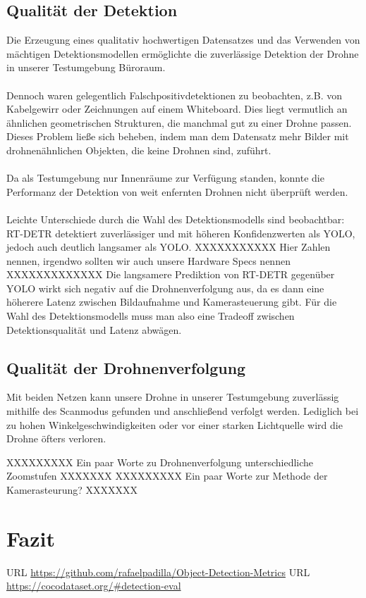 \documentclass[runningheads]{llncs}
\begin{document}
\subsection{Qualität der Detektion}
Die Erzeugung eines qualitativ hochwertigen Datensatzes und das Verwenden von mächtigen Detektionsmodellen ermöglichte die zuverlässige Detektion der Drohne in unserer Testumgebung Büroraum.\\\\
Dennoch waren gelegentlich Falschpositivdetektionen zu beobachten, z.B. von Kabelgewirr oder Zeichnungen auf einem Whiteboard. Dies liegt vermutlich an ähnlichen geometrischen Strukturen, die manchmal gut zu einer Drohne passen. Dieses Problem ließe sich beheben, indem man dem Datensatz mehr Bilder mit drohnenähnlichen Objekten, die keine Drohnen sind, zuführt.\\\\
Da als Testumgebung nur Innenräume zur Verfügung standen, konnte die Performanz der Detektion von weit enfernten Drohnen nicht überprüft werden.\\\\
Leichte Unterschiede durch die Wahl des Detektionsmodells sind beobachtbar: RT-DETR detektiert zuverlässiger und mit höheren Konfidenzwerten als YOLO, jedoch auch deutlich langsamer als YOLO. XXXXXXXXXXX Hier Zahlen nennen, irgendwo sollten wir auch unsere Hardware Specs nennen XXXXXXXXXXXXX
Die langsamere Prediktion von RT-DETR gegenüber YOLO wirkt sich negativ auf die Drohnenverfolgung aus, da es dann eine höherere Latenz zwischen Bildaufnahme und Kamerasteuerung gibt.
Für die Wahl des Detektionsmodells muss man also eine Tradeoff zwischen Detektionsqualität und Latenz abwägen.
\subsection{Qualität der Drohnenverfolgung}
Mit beiden Netzen kann unsere Drohne in unserer Testumgebung zuverlässig mithilfe des Scanmodus gefunden und anschließend verfolgt werden.
Lediglich bei zu hohen Winkelgeschwindigkeiten oder vor einer starken Lichtquelle wird die Drohne öfters verloren.

XXXXXXXXX Ein paar Worte zu Drohnenverfolgung unterschiedliche Zoomstufen XXXXXXX
XXXXXXXXX Ein paar Worte zur Methode der Kamerasteurung? XXXXXXX
\section{Fazit}

\begin{thebibliography}{3}

URL \url{https://github.com/rafaelpadilla/Object-Detection-Metrics}
 URL \url{https://cocodataset.org/\#detection-eval}

\end{thebibliography}
\end{document}
